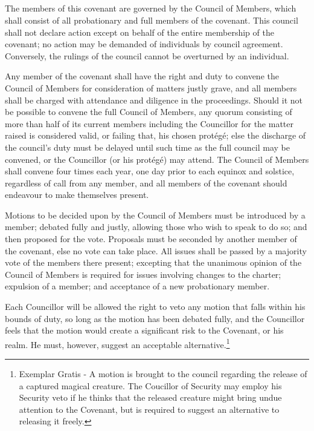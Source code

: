 \documentclass [a4paper,portrait]{article}
\begin{document}
\begin{multicols}{2}

\begin{small}
\section*{\fontsize{30}{35}\selectfont{Governance of this Covenant}}
	The members of this covenant are governed by the Council of Members, which shall consist of all 
	probationary and full members of the covenant. This council shall not declare action except on behalf 
	of the entire membership of the covenant; no action may be demanded of individuals by council 
	agreement. Conversely, the rulings of the council cannot be overturned by an individual.
	
	Any member of the covenant shall have the right and duty to convene the Council of Members for 
	consideration of matters justly grave, and all members shall be charged with attendance and diligence 
	in the proceedings. Should it not be possible to convene the full Council of Members, any quorum 
	consisting of more than half of its current members including the Councillor for the matter raised is 
	considered valid, or failing that, his chosen prot\'eg\'e; else the discharge of the council’s duty 
	must be delayed until such time as the full council may be convened, or the Councillor (or his 
	prot\'eg\'e) may attend. The Council of Members shall convene four times each year, one day prior to
	each equinox and solstice, regardless of call from any member, and all members of the covenant should
	endeavour to make themselves present.
	
	Motions to be decided upon by the Council of Members must be introduced by a member; debated fully and
	justly, allowing those who wish to speak to do so; and then proposed for the vote. Proposals must be
	seconded by another member of the covenant, else no vote can take place. All issues shall be passed by
	a majority vote of the members there present; excepting that the unanimous opinion of the Council of
	Members is required for issues involving changes to the charter; expulsion of a member; and acceptance
	of a new probationary member.
	
	Each Councillor will be allowed the right to veto any motion that falls within his bounds of duty, so
	long as the motion has been debated fully, and the Councillor feels that the motion would create a
	significant risk to the Covenant,  or his realm. He must, however, suggest an acceptable alternative.\footnote{Exemplar Gratis - A motion is brought to
		the council regarding the release of a captured magical creature. The Coucillor of Security may
		employ his Security veto if he thinks that the released creature might bring undue attention to
		the Covenant, but is required to suggest an alternative to releasing it freely.}
	

\end{small}
\end{multicols}
\end{document}
